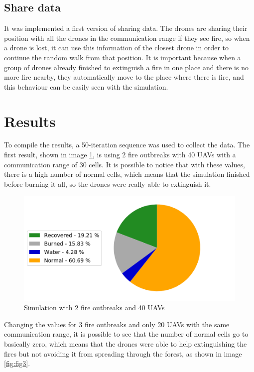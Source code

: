 \documentclass{article}
\begin{document}
\subsection{Share data}
It was implemented a first version of sharing data. The drones are sharing their position with all the drones in the communication range if they see fire, so when a drone is lost, it can use this information of the closest drone in order to continue the random walk from that position. It is important because when a group of drones already finished to extinguish a fire in one place and there is no more fire nearby, they automatically move to the place where there is fire, and this behaviour can be easily seen with the simulation.

\section{Results}
To compile the results, a 50-iteration sequence was used to collect the data. The first result, shown in image \ref{fig:fig2}, is using 2 fire outbreaks with 40 UAVs with a communication range of 30 cells. It is possible to notice that with these values, there is a high number of normal cells, which means that the simulation finished before burning it all, so the drones were really able to extinguish it.

\begin{figure}[!ht]
\centering
\includegraphics[scale=0.6]{fires_2_uavs_40_range_30}
\caption{Simulation with 2 fire outbreaks and 40 UAVs}
\label{fig:fig2}
\end{figure}

Changing the values for 3 fire outbreaks and only 20 UAVs with the same communication range, it is possible to see that the number of normal cells go to basically zero, which means that the drones were able to help extinguishing the fires but not avoiding it from spreading through the forest, as shown in image \ref{fig:fig3}.
\end{document}
